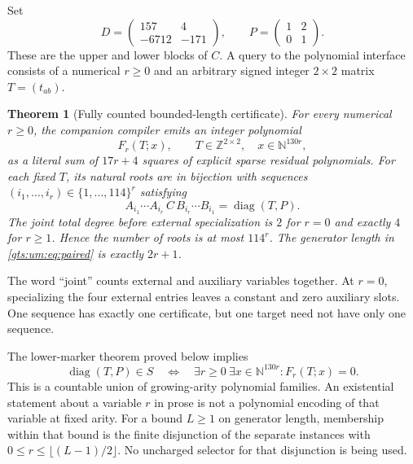 \documentclass[11pt,letterpaper]{article}
\newtheorem{theorem}{Theorem}[section]
\theoremstyle{definition}
\theoremstyle{remark}
\newcommand{\Z}{\mathbb Z}
\newcommand{\N}{\mathbb N}
\newcommand{\smallmat}[4]{\begin{pmatrix}#1&#2\\#3&#4\end{pmatrix}}
\newcommand{\diag}{\operatorname{diag}}
\begin{document}
Set
\begin{equation}\label{gts:um:eq:DP}
 D=\smallmat{157}{4}{-6712}{-171},\qquad P=\smallmat{1}{2}{0}{1}.
\end{equation}
These are the upper and lower blocks of $C$. A query to the polynomial interface consists of a numerical $r\geq0$ and an arbitrary signed integer $2\times2$ matrix $T=(t_{ab})$.

\begin{theorem}[Fully counted bounded-length certificate]
\label{gts:um:thm:sos}
For every numerical $r\geq0$, the companion compiler emits an integer polynomial
\[
 F_r(T;x),\qquad T\in\Z^{2\times2},\quad x\in\N^{130r},
\]
as a literal sum of $17r+4$ squares of explicit sparse residual polynomials. For each fixed $T$, its natural roots are in bijection with sequences $(i_1,\ldots,i_r)\in\{1,\ldots,114\}^r$ satisfying
\begin{equation}\label{gts:um:eq:paired}
 A_{i_1}\cdots A_{i_r}\,C\,B_{i_r}\cdots B_{i_1}=\diag(T,P).
\end{equation}
The joint total degree before external specialization is $2$ for $r=0$ and exactly $4$ for $r\geq1$. Hence the number of roots is at most $114^r$. The generator length in \eqref{gts:um:eq:paired} is exactly $2r+1$.
\end{theorem}

The word ``joint'' counts external and auxiliary variables together. At $r=0$, specializing the four external entries leaves a constant and zero auxiliary slots. One sequence has exactly one certificate, but one target need not have only one sequence.

The lower-marker theorem proved below implies
\begin{equation}\label{gts:um:eq:union}
 \diag(T,P)\in S
 \quad\Longleftrightarrow\quad
 \exists r\geq0\ \exists x\in\N^{130r}:F_r(T;x)=0.
\end{equation}
This is a countable union of growing-arity polynomial families. An existential statement about a variable $r$ in prose is not a polynomial encoding of that variable at fixed arity. For a bound $L\geq1$ on generator length, membership within that bound is the finite disjunction of the separate instances with $0\leq r\leq\lfloor(L-1)/2\rfloor$. No uncharged selector for that disjunction is being used.
\end{document}
